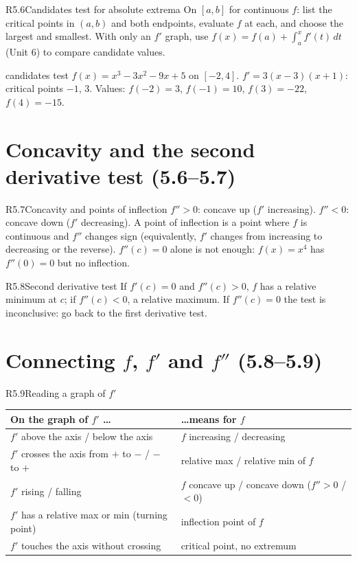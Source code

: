 \documentclass{apcalc}
\begin{document}
\begin{rulebox}{R5.6}{Candidates test for absolute extrema}
On $[a,b]$ for continuous $f$: list the critical points in $(a,b)$ and both endpoints, evaluate $f$ at each, and choose the largest and smallest. With only an $f'$ graph, use $f(x)=f(a)+\int_a^x f'(t)\,dt$ (Unit 6) to compare candidate values.
\end{rulebox}

\begin{example}{candidates test}
$f(x)=x^3-3x^2-9x+5$ on $[-2,4]$. $f'=3(x-3)(x+1)$: critical points $-1$, $3$. Values: $f(-2)=3$, $f(-1)=10$, $f(3)=-22$, $f(4)=-15$. 
\end{example}

\section{Concavity and the second derivative test (5.6--5.7)}

\begin{rulebox}{R5.7}{Concavity and points of inflection}
$f''>0$: concave up ($f'$ increasing). $f''<0$: concave down ($f'$ decreasing). A point of inflection is a point where $f$ is continuous and $f''$ changes sign (equivalently, $f'$ changes from increasing to decreasing or the reverse). $f''(c)=0$ alone is not enough: $f(x)=x^4$ has $f''(0)=0$ but no inflection.
\end{rulebox}

\begin{rulebox}{R5.8}{Second derivative test}
If $f'(c)=0$ and $f''(c)>0$, $f$ has a relative minimum at $c$; if $f''(c)<0$, a relative maximum. If $f''(c)=0$ the test is inconclusive: go back to the first derivative test.
\end{rulebox}

\section{Connecting $f$, $f'$ and $f''$ (5.8--5.9)}

\begin{rulebox}{R5.9}{Reading a graph of $f'$}
\begin{tabular}{@{}ll@{}}
On the graph of $f'$ \dots & \dots means for $f$\\\midrule
$f'$ above the axis / below the axis & $f$ increasing / decreasing\\
$f'$ crosses the axis from $+$ to $-$ / $-$ to $+$ & relative max / relative min of $f$\\
$f'$ rising / falling & $f$ concave up / concave down ($f''>0$ / $<0$)\\
$f'$ has a relative max or min (turning point) & inflection point of $f$\\
$f'$ touches the axis without crossing & critical point, no extremum\\
\end{tabular}
\end{rulebox}
\end{document}
